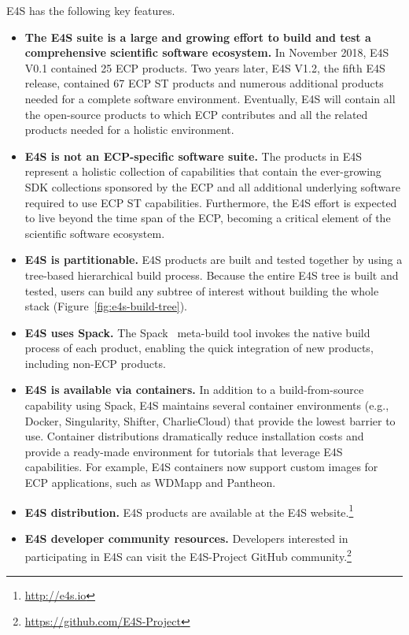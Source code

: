 E4S has the following key features.
\begin{itemize}
	\item \textbf{The E4S suite is a large and growing effort to build and test a comprehensive scientific software ecosystem.} In November 2018, E4S V0.1 contained 25 ECP products.  Two years later, E4S V1.2, the fifth E4S release, contained 67 ECP ST products and numerous additional products needed for a complete software environment.  Eventually, E4S will contain all the open-source products to which ECP contributes and all the related products needed for a holistic environment.
	\item \textbf{E4S is not an ECP-specific software suite.}  The products in E4S represent a holistic collection of capabilities that contain the ever-growing SDK collections sponsored by the ECP and all additional underlying software required to use ECP ST capabilities.  Furthermore, the E4S effort is expected to live beyond the time span of the ECP, becoming a critical element of the scientific software ecosystem.
	\item \textbf{E4S is partitionable.} E4S products are built and tested together by using a tree-based hierarchical build process.  Because the entire E4S tree is built and tested, users can build any subtree of interest without building the whole stack (Figure~\ref{fig:e4s-build-tree}).
	\item \textbf{E4S uses Spack.} The Spack~\cite{gamblin+:ecp18-spack-tutorial} meta-build tool invokes the native build process of each product, enabling the quick integration of new products, including non-ECP products.
	\item \textbf{E4S is available via containers.} In addition to a build-from-source capability using Spack, E4S maintains several container environments (e.g., Docker, Singularity, Shifter, CharlieCloud) that provide the lowest barrier to use.  Container distributions dramatically reduce installation costs and provide a ready-made environment for tutorials that leverage E4S capabilities.  For example, E4S containers now support custom images for ECP applications, such as WDMapp and Pantheon.
	\item \textbf{E4S distribution.} E4S products are available at the E4S website.\footnote{\url{http://e4s.io}}
	\item \textbf{E4S developer community resources.} Developers interested in participating in E4S can visit the E4S-Project GitHub community.\footnote{\url{https://github.com/E4S-Project}}	
\end{itemize}

